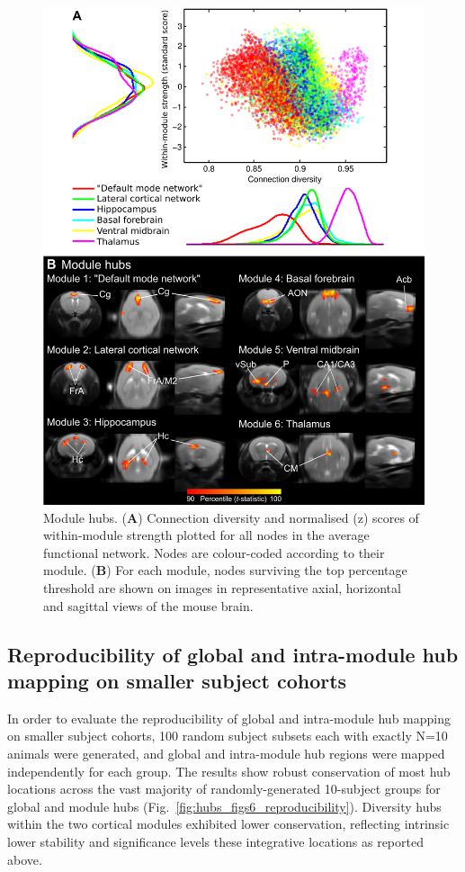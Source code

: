 \begin{figure}[th]
    \centering
    \includegraphics[scale=0.6]{figures/hubs_figure_04_module_hubs_NEW.png}
    \decoRule
    \caption[Module hubs.]{Module hubs. (\textbf{A}) Connection diversity and
    normalised (z) scores of within-module strength plotted for all nodes in the
    average functional network. Nodes are colour-coded according to their
    module.  (\textbf{B}) For each module, nodes surviving the top percentage
    threshold are shown on images in representative axial, horizontal and
    sagittal views of the mouse brain.}
    \label{fig:hubs_fig4_module_hubs}
\end{figure}

\subsection{Reproducibility of global and intra-module hub mapping on smaller
subject cohorts}

In order to evaluate the reproducibility of global and intra-module hub mapping
on smaller subject cohorts, 100 random subject subsets each with exactly N=10
animals were generated, and global and intra-module hub regions were mapped
independently for each group. The results show robust conservation of most hub
locations across the vast majority of randomly-generated 10-subject groups for
global and module hubs (Fig.~\ref{fig:hubs_figs6_reproducibility}). Diversity
hubs within the two cortical modules exhibited lower conservation, reflecting
intrinsic lower stability and significance levels these integrative locations as
reported above. 

